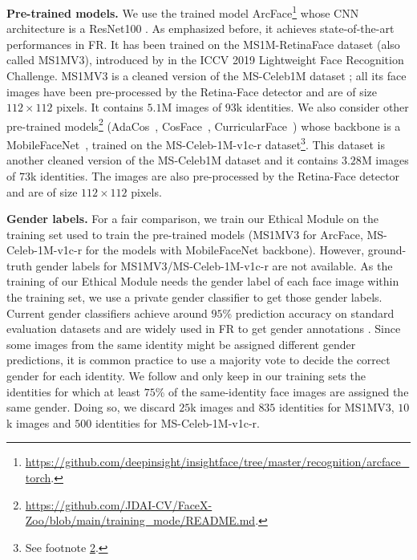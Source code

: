 \documentclass[nohyperref]{article}
\theoremstyle{plain}
\theoremstyle{definition}
\theoremstyle{remark}
\begin{document}
{\bf Pre-trained models.} We use the trained model ArcFace\footnote{\url{https://github.com/deepinsight/insightface/tree/master/recognition/arcface_torch}.} whose CNN architecture is a ResNet100 \cite{resnet100_forFR}. As emphasized before, it achieves state-of-the-art performances in FR. It has been trained on the MS1M-RetinaFace dataset (also called MS1MV3), introduced by \cite{ms1m_retinaface} in the ICCV 2019 Lightweight Face Recognition Challenge. MS1MV3 is a cleaned version of the MS-Celeb1M dataset \cite{ms-celeb-1m}; all its face images have been pre-processed by the Retina-Face detector \cite{retinaface_detector} and are of size $112\times112$ pixels. It  contains $5.1$M images of $93$k identities. We also consider other pre-trained models\footnote{\label{footnote:faceX_zoo}\url{https://github.com/JDAI-CV/FaceX-Zoo/blob/main/training_mode/README.md}.} (AdaCos~\cite{adacos}, CosFace~\cite{cosface}, CurricularFace~\cite{curricularface}) whose backbone is a MobileFaceNet~\cite{mobilefacenets}, trained on the MS-Celeb-1M-v1c-r dataset\footnote{See footnote \ref{footnote:faceX_zoo}.}. This dataset is another cleaned version of the MS-Celeb1M dataset and it contains $3.28$M images of $73$k identities. The images are also pre-processed by the Retina-Face detector and are of size $112\times112$ pixels.

{\bf Gender labels.} For a fair comparison, we train our Ethical Module on the training set used to train the pre-trained models (MS1MV3 for ArcFace, MS-Celeb-1M-v1c-r for the models with MobileFaceNet backbone). However, ground-truth gender labels for MS1MV3/MS-Celeb-1M-v1c-r are not available. As the training of our Ethical Module needs the gender label of each face image within the training set, we use a private gender classifier to get those gender labels. Current gender classifiers achieve around $95$\% prediction accuracy on standard evaluation datasets and are widely used in FR to get gender annotations \cite{measure_privacy, gac}. Since some images from the same identity might be assigned different gender predictions, it is common practice to use a majority vote to decide the correct gender for each identity. We follow \cite{gender_balanced_data} and only keep in our training sets the identities for which at least $75$\% of the same-identity face images are assigned the same gender. Doing so, we discard $25$k images and $835$ identities for MS1MV3, $10$k images and $500$ identities for MS-Celeb-1M-v1c-r.
\end{document}
